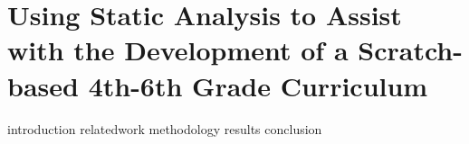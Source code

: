 \chapter{Using Static Analysis to Assist with the Development of a
  Scratch-based 4th-6th Grade Curriculum}
\label{chap:curriculum}

\def\currentprefix{curriculum}

{introduction}
{relatedwork}
{methodology}
{results}
{conclusion}
